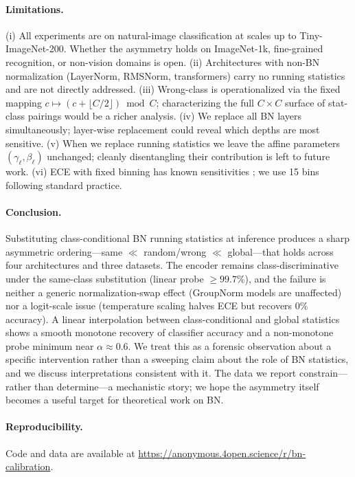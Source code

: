\documentclass{article}
\begin{document}
\paragraph{Limitations.} (i) All experiments are on natural-image classification at scales up to Tiny-ImageNet-200. Whether the asymmetry holds on ImageNet-1k, fine-grained recognition, or non-vision domains is open. (ii) Architectures with non-BN normalization (LayerNorm, RMSNorm, transformers) carry no running statistics and are not directly addressed. (iii) Wrong-class is operationalized via the fixed mapping $c \mapsto (c+\lfloor C/2\rfloor) \bmod C$; characterizing the full $C\times C$ surface of stat-class pairings would be a richer analysis. (iv) We replace all BN layers simultaneously; layer-wise replacement could reveal which depths are most sensitive. (v) When we replace running statistics we leave the affine parameters $(\gamma_\ell,\beta_\ell)$ unchanged; cleanly disentangling their contribution is left to future work. (vi) ECE with fixed binning has known sensitivities \citep{nixon2019measuring}; we use 15 bins following standard practice.

\paragraph{Conclusion.} Substituting class-conditional BN running statistics at inference produces a sharp asymmetric ordering---same $\ll$ random/wrong $\ll$ global---that holds across four architectures and three datasets. The encoder remains class-discriminative under the same-class substitution (linear probe $\geq 99.7\%$), and the failure is neither a generic normalization-swap effect (GroupNorm models are unaffected) nor a logit-scale issue (temperature scaling halves ECE but recovers 0\% accuracy). A linear interpolation between class-conditional and global statistics shows a smooth monotone recovery of classifier accuracy and a non-monotone probe minimum near $\alpha\approx 0.6$. We treat this as a forensic observation about a specific intervention rather than a sweeping claim about the role of BN statistics, and we discuss interpretations consistent with it. The data we report constrain---rather than determine---a mechanistic story; we hope the asymmetry itself becomes a useful target for theoretical work on BN.

\paragraph{Reproducibility.} Code and data are available at \url{https://anonymous.4open.science/r/bn-calibration}.
\end{document}
